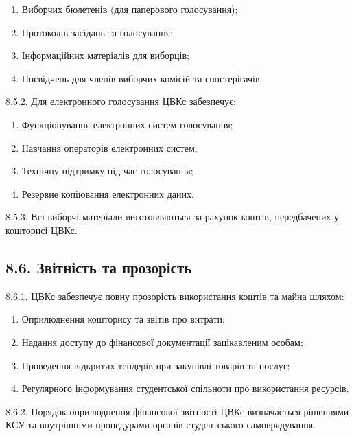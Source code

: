         \begin{enumerate}[label=\alph*)]
            \item Виборчих бюлетенів (для паперового голосування);
            \item Протоколів засідань та голосування;
            \item Інформаційних матеріалів для виборців;
            \item Посвідчень для членів виборчих комісій та спостерігачів.
        \end{enumerate}

    8.5.2. Для електронного голосування ЦВКс забезпечує:

        \begin{enumerate}[label=\alph*)]
            \item Функціонування електронних систем голосування;
            \item Навчання операторів електронних систем;
            \item Технічну підтримку під час голосування;
            \item Резервне копіювання електронних даних.
        \end{enumerate}

    8.5.3. Всі виборчі матеріали виготовляються за рахунок коштів, передбачених у кошторисі ЦВКс.

\subsection*{8.6. Звітність та прозорість}
    8.6.1. ЦВКс забезпечує повну прозорість використання коштів та майна шляхом:

        \begin{enumerate}[label=\alph*)]
            \item Оприлюднення кошторису та звітів про витрати;
            \item Надання доступу до фінансової документації зацікавленим особам;
            \item Проведення відкритих тендерів при закупівлі товарів та послуг;
            \item Регулярного інформування студентської спільноти про використання ресурсів.
        \end{enumerate}

    8.6.2. Порядок оприлюднення фінансової звітності ЦВКс визначається рішеннями КСУ та внутрішніми процедурами органів студентського самоврядування.